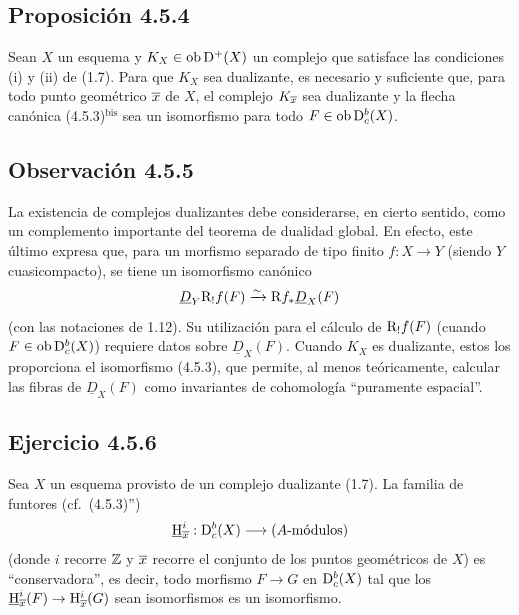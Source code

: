 \subsection*{Proposición 4.5.4}
Sean $X$ un esquema y $K_X\in\operatorname{ob}\mathrm{D}^+(X)$ un complejo que satisface las condiciones (i) y (ii) de (1.7). Para que $K_X$ sea dualizante, es necesario y suficiente que, para todo punto geométrico $\overline{x}$ de $X$, el complejo $K_{\overline{x}}$ sea dualizante y la flecha canónica (4.5.3)$^{\mathrm{bis}}$ sea un isomorfismo para todo $F\in\operatorname{ob}\mathrm{D}_c^b(X)$.

\subsection*{Observación 4.5.5}
La existencia de complejos dualizantes debe considerarse, en cierto sentido, como un complemento importante del teorema de dualidad global. En efecto, este último expresa que, para un morfismo separado de tipo finito $f:X\to Y$ (siendo $Y$ cuasicompacto), se tiene un isomorfismo canónico
\[
\underline{D}_Y\mathrm{R}_!f(F)\xrightarrow{\sim}\mathrm{R} f_*\underline{D}_X(F)
\]
(con las notaciones de 1.12). Su utilización para el cálculo de $\mathrm{R}_!f(F)$ (cuando $F\in\operatorname{ob}\mathrm{D}_c^b(X)$) requiere datos sobre $\underline{D}_X(F)$. Cuando $K_X$ es dualizante, estos los proporciona el isomorfismo (4.5.3), que permite, al menos teóricamente, calcular las fibras de $\underline{D}_X(F)$ como invariantes de cohomología ``puramente espacial''.

\subsection*{Ejercicio 4.5.6}
Sea $X$ un esquema provisto de un complejo dualizante (1.7). La familia de funtores (cf.~(4.5.3)'')
\[
\underline{\mathrm{H}}_{\overline{x}}^i:\mathrm{D}_c^b(X)\longrightarrow (A\text{-módulos})
\]
(donde $i$ recorre $\mathbb{Z}$ y $\overline{x}$ recorre el conjunto de los puntos geométricos de $X$) es ``conservadora'', es decir, todo morfismo $F\to G$ en $\mathrm{D}_c^b(X)$ tal que los $\underline{\mathrm H}_{\overline{x}}^i(F)\to\mathrm{H}_{\overline{x}}^i(G)$ sean isomorfismos es un isomorfismo.
